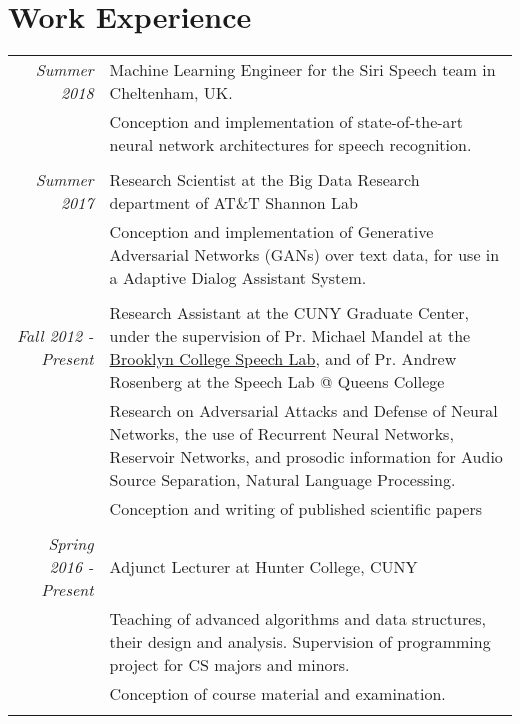 \documentclass[a4paper,10pt]{article}
\begin{document}
\section{Work Experience}
    \vspace{0.2cm}
    \begin{tabular}{r|p{14cm}}
        \emph{Summer 2018} & Machine Learning Engineer for the Siri Speech team in Cheltenham, UK.\\
        & \footnotesize{Conception and implementation of state-of-the-art neural network architectures for speech recognition.}\\
        \multicolumn{2}{c}{} \\

        \emph{Summer 2017} & Research Scientist at the Big Data Research department of AT\&T Shannon Lab\\
        & \footnotesize{Conception and implementation of Generative Adversarial Networks (GANs) over text data, for use in a Adaptive Dialog Assistant System.}\\
        \multicolumn{2}{c}{} \\

        \emph{Fall 2012 - Present} & Research Assistant  at the CUNY Graduate Center, under the supervision of Pr. Michael Mandel at the \href{https://www.gc.cuny.edu/CUNY_GC/media/Computer-Science/SpeechLab.pdf}{Brooklyn College Speech Lab}, and of Pr. Andrew Rosenberg at the {Speech Lab @ Queens College} \\
        & \footnotesize{Research on Adversarial Attacks and Defense of Neural Networks, the use of Recurrent Neural Networks, Reservoir Networks, and prosodic information for Audio Source Separation, Natural Language Processing.}\\
        & \footnotesize{Conception and writing of published scientific papers}\\
        \multicolumn{2}{c}{} \\

        \emph{Spring 2016 - Present} &  Adjunct Lecturer at Hunter College, CUNY\\
        & \footnotesize{Teaching of advanced algorithms and data structures, their design and analysis. Supervision of programming project for CS majors and minors.}\\
        & \footnotesize{Conception of course material and examination.}\\
        \multicolumn{2}{c}{} \\


\end{tabular}
\end{document}

